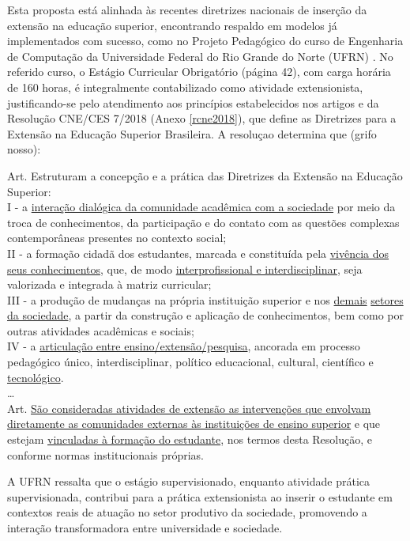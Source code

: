 Esta proposta está alinhada às recentes diretrizes nacionais de inserção da extensão na educação superior, encontrando respaldo em modelos já implementados com sucesso, como no Projeto Pedagógico do curso de Engenharia de Computação da Universidade Federal do Rio Grande do Norte (UFRN) \cite{ufrn2024}. No referido curso, o Estágio Curricular Obrigatório (página 42), com carga horária de 160 horas, é integralmente contabilizado como atividade extensionista, justificando-se pelo atendimento aos princípios estabelecidos nos artigos  e   da Resolução CNE/CES   7/2018 (Anexo \ref{rcne2018}), que define as Diretrizes para a Extensão na Educação Superior Brasileira. A resoluçao determina que (grifo nosso):


\begin{itquotation}
    \noindent%
    Art.  Estruturam a concepção e a prática das Diretrizes da Extensão na Educação
    Superior:\\
    I - a \underline{interação dialógica da comunidade acadêmica com a sociedade} por meio da
    troca de conhecimentos, da participação e do contato com as questões complexas
    contemporâneas presentes no contexto social;\\
    II - a formação cidadã dos estudantes, marcada e constituída pela \underline{vivência dos} \underline{seus
        conhecimentos}, que, de modo \underline{interprofissional e interdisciplinar}, seja
    valorizada e integrada à matriz curricular;\\
    III - a produção de mudanças na própria instituição superior e nos \underline{demais} \underline{setores da
        sociedade}, a partir da construção e aplicação de conhecimentos, bem como por outras
    atividades acadêmicas e sociais;\\
    IV - a \underline{articulação entre ensino/extensão/pesquisa}, ancorada em processo pedagógico
    único, interdisciplinar, político educacional, cultural, científico e \underline{tecnológico}.\\
    \ldots\\
    Art.  \underline{São consideradas atividades de extensão as intervenções que envolvam} \underline{diretamente as comunidades externas às instituições de ensino superior} e que estejam \underline{vinculadas à formação do estudante},
    nos termos desta Resolução, e conforme normas institucionais próprias.
\end{itquotation}

A UFRN ressalta que o estágio supervisionado, enquanto atividade prática supervisionada, contribui para a prática extensionista ao inserir o estudante em contextos reais de atuação no setor produtivo da sociedade, promovendo a interação transformadora entre universidade e sociedade.

